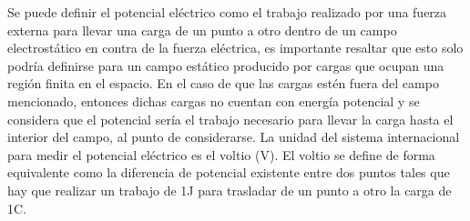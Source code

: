 Se puede definir el potencial eléctrico como el trabajo realizado por una fuerza externa para llevar una carga de un punto a otro dentro de un campo electrostático en contra de la fuerza eléctrica, es importante resaltar que esto solo podría definirse para un campo estático producido por cargas que ocupan una región finita en el espacio. En el caso de que las cargas estén fuera del campo mencionado, entonces dichas cargas no cuentan con energía potencial y se considera que el potencial sería el trabajo necesario para llevar la carga hasta el interior del campo, al punto de considerarse. La unidad del sistema internacional para medir el potencial eléctrico es el voltio (V). \newline \hfill \break
El voltio se define de forma equivalente como la diferencia de potencial existente entre dos puntos tales que hay que realizar un trabajo de 1J para trasladar de un punto a otro la carga de 1C.

